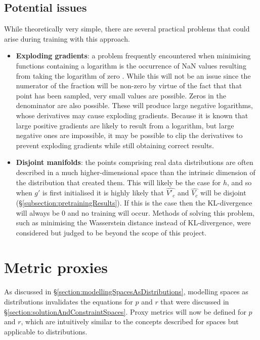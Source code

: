\documentclass[../../main.tex]{subfiles}
\begin{document}
\subsection{Potential issues} \label{subsection:potentialIssues}

While theoretically very simple, there are several practical problems that could arise during training with this approach.
\begin{itemize}
    \item[] \textbf{Exploding gradients}: a problem frequently encountered when minimising functions containing a logarithm is the occurrence of NaN values resulting from taking the logarithm of zero \cite{bengio94}.
    While this will not be an issue since the numerator of the fraction will be non-zero by virtue of the fact that that point has been sampled, very small values are possible.
    Zeros in the denominator are also possible.
    These will produce large negative logarithms, whose derivatives may cause exploding gradients.
    Because it is known that large positive gradients are likely to result from a logarithm, but large negative ones are impossible, it may be possible to clip the derivatives to prevent exploding gradients while still obtaining correct results.   
    \item[] \textbf{Disjoint manifolds}: the points comprising real data distributions are often described in a much higher-dimensional space than the intrinsic dimension of the distribution that created them.
    This will likely be the case for $h$, and so when $g'$ is first initialised it is highly likely that $\hat{V'_c}$ and $\hat{V_c}$ will be disjoint (\S\ref{subsection:pretrainingResults}).
    If this is the case then the KL-divergence will always be 0 and no training will occur.
    Methods of solving this problem, such as minimising the Wasserstein distance instead of KL-divergence, were considered but judged to be beyond the scope of this project.
\end{itemize}

\section{Metric proxies} \label{section:metricProxies}

As discussed in \S\ref{section:modellingSpacesAsDistributions}, modelling spaces as distributions invalidates the equations for $p$ and $r$ that were discussed in \S\ref{section:solutionAndConstraintSpaces}.
Proxy metrics will now be defined for $p$ and $r$, which are intuitively similar to the concepts described for spaces but applicable to distributions.
\end{document}
